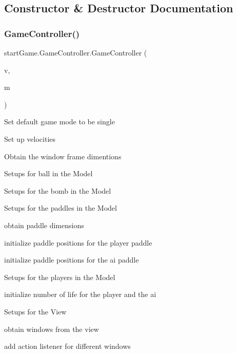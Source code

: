 \subsection{Constructor \& Destructor Documentation}
\hypertarget{classstart_game_1_1_game_controller_aecc647e49ed23b571160d7d7c68b04d7}{}\label{classstart_game_1_1_game_controller_aecc647e49ed23b571160d7d7c68b04d7} 
\subsubsection{\texorpdfstring{Game\+Controller()}{GameController()}}
{\footnotesize\ttfamily start\+Game.\+Game\+Controller.\+Game\+Controller (\begin{DoxyParamCaption}\item[{\hyperlink{classview_1_1_game_view}{Game\+View}}]{v,  }\item[{\hyperlink{classmodel_1_1_game_model}{Game\+Model}}]{m }\end{DoxyParamCaption})}

Set default game mode to be single

Set up velocities

Obtain the window frame dimentions

Setups for ball in the Model

Setups for the bomb in the Model

Setups for the paddles in the Model
\begin{DoxyItemize}
\item obtain paddle dimensions
\item initialize paddle positions for the player paddle
\item initialize paddle positions for the ai paddle
\end{DoxyItemize}

Setups for the players in the Model
\begin{DoxyItemize}
\item initialize number of life for the player and the ai
\end{DoxyItemize}

Setups for the View
\begin{DoxyItemize}
\item obtain windows from the view
\item add action listener for different windows
\end{DoxyItemize}

